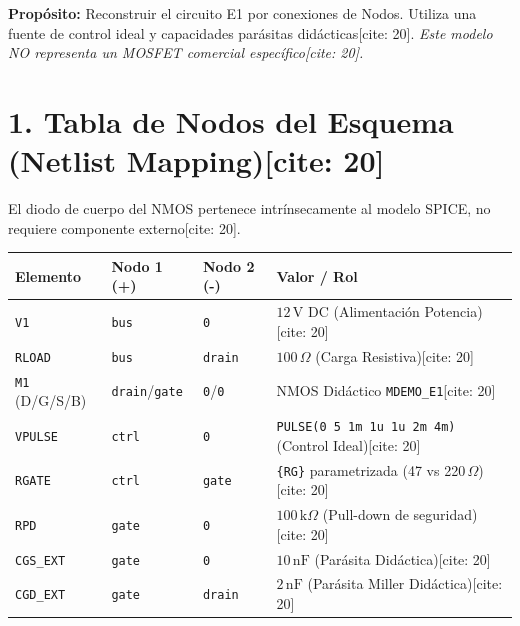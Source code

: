 \documentclass[11pt, a4paper]{article}
\begin{document}
\begin{tcolorbox}[colback=ucbblue!5, colframe=ucbblue, title=\textbf{E1 — Guía de Simulación LTspice desde un Esquema Manual[cite: 20]}]
    \textbf{Propósito:} Reconstruir el circuito E1 por conexiones de Nodos. Utiliza una fuente de control ideal y capacidades parásitas didácticas[cite: 20]. \textit{Este modelo NO representa un MOSFET comercial específico[cite: 20].}
\end{tcolorbox}

\section*{1. Tabla de Nodos del Esquema (Netlist Mapping)[cite: 20]}
El diodo de cuerpo del NMOS pertenece intrínsecamente al modelo SPICE, no requiere componente externo[cite: 20].

\renewcommand{\arraystretch}{1.5}
\begin{tabularx}{\textwidth}{|l|l|l|>{\raggedright\arraybackslash}X|}
\hline
\rowcolor{gray!20}
\textbf{Elemento} & \textbf{Nodo 1 (+)} & \textbf{Nodo 2 (-)} & \textbf{Valor / Rol} \\ \hline
\texttt{V1} & \texttt{bus} & \texttt{0} & $12\,\text{V DC}$ (Alimentación Potencia)[cite: 20] \\ \hline
\texttt{RLOAD} & \texttt{bus} & \texttt{drain} & $100\,\Omega$ (Carga Resistiva)[cite: 20] \\ \hline
\texttt{M1} (D/G/S/B) & \texttt{drain}/\texttt{gate} & \texttt{0}/\texttt{0} & NMOS Didáctico \texttt{MDEMO\_E1}[cite: 20] \\ \hline
\texttt{VPULSE} & \texttt{ctrl} & \texttt{0} & \texttt{PULSE(0 5 1m 1u 1u 2m 4m)} (Control Ideal)[cite: 20] \\ \hline
\texttt{RGATE} & \texttt{ctrl} & \texttt{gate} & \texttt{\{RG\}} parametrizada (47 vs 220$\,\Omega$)[cite: 20] \\ \hline
\texttt{RPD} & \texttt{gate} & \texttt{0} & $100\,\text{k}\Omega$ (Pull-down de seguridad)[cite: 20] \\ \hline
\texttt{CGS\_EXT} & \texttt{gate} & \texttt{0} & $10\,\text{nF}$ (Parásita Didáctica)[cite: 20] \\ \hline
\texttt{CGD\_EXT} & \texttt{gate} & \texttt{drain} & $2\,\text{nF}$ (Parásita Miller Didáctica)[cite: 20] \\ \hline
\end{tabularx}
\end{document}
